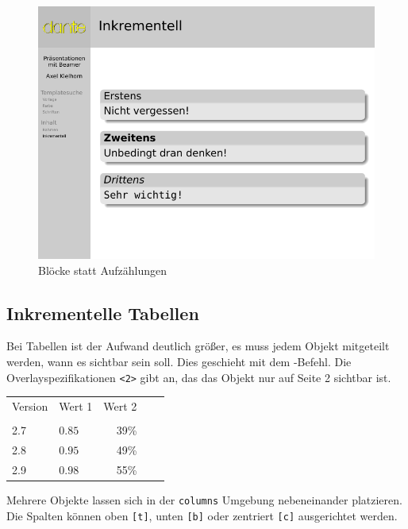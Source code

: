 \begin{figure}
  \includegraphics[width=\textwidth]{beamer-block}
  \caption{Blöcke statt Aufzählungen}
  \label{fig:block}
\end{figure}

\subsection{Inkrementelle Tabellen}

Bei Tabellen ist der Aufwand deutlich größer, es muss jedem Objekt
mitgeteilt werden, wann es sichtbar sein soll. Dies geschieht mit dem
-Befehl. Die Overlayspezifikationen \texttt{<2>} gibt an, das das
Objekt nur auf Seite 2 sichtbar ist. 

\begin{lfgwcode}{}
\begin{tabular}{llrrr}
Version    & Wert 1 & Wert 2          & \uncover<2>{Wert 2} \\
           &        &                 & \uncover<2>{optimiert}\\
2.7        & $0.85$ &           39\%  & \uncover<2>{35\%}\\
2.8        & $0.95$ & \alert<2>{49\%} & \uncover<2>{\alert<2>{44\%}}\\
2.9        & $0.98$ &           55\%  & \uncover<2>{51\%}
\end{tabular}
\end{lfgwcode}

Mehrere Objekte lassen sich in der \texttt{columns} Umgebung nebeneinander
platzieren. Die Spalten können oben \texttt{[t]}, unten \texttt{[b]} oder
zentriert \texttt{[c]} ausgerichtet werden.

